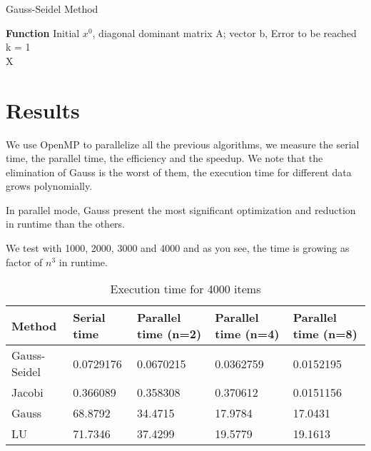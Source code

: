 \documentclass[letterpaper,12pt]{article}
\begin{document}
\begin{center}
\begin{algorithm}[H]
   \caption{Gauss-Seidel Method}
   \textbf{Function} Initial $x^0$, diagonal dominant matrix A; vector b, Error to be reached\\
   k = 1 \\
   \Return X
  \end{algorithm}  
\end{center}

\section{Results}

We use OpenMP to parallelize all the previous algorithms, we measure the serial time, the parallel time, the efficiency and the speedup.
We note that the elimination of Gauss is the worst of them, the execution time for different data grows polynomially.

In parallel mode, Gauss present the most significant optimization and reduction in runtime than the others.

We test with 1000, 2000, 3000 and 4000 and as you see, the time is growing as factor of $n^3$ in runtime.

\begin{table}[!htb]
    \centering
      \begin{tabular}{|l|l|l|l|l|}
        \hline
        Method &  Serial time & Parallel time (n=2) & Parallel time (n=4) & Parallel time (n=8)\\
        \hline
        Gauss-Seidel & 0.0729176 & 0.0670215 & 0.0362759 & 0.0152195\\
        Jacobi &  0.366089 & 0.358308 & 0.370612 & 0.0151156\\
        Gauss  & 68.8792 & 34.4715 & 17.9784 & 17.0431 \\
        LU  &  71.7346 & 37.4299 & 19.5779 & 19.1613\\
        \hline
      \end{tabular}
    \caption{Execution time for 4000 items}\label{tuntime-table}
\end{table}
\end{document}
